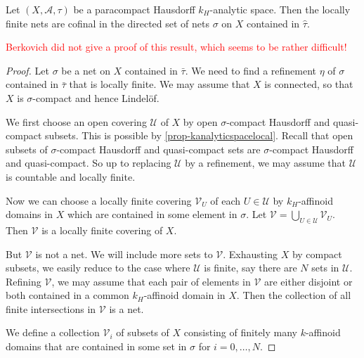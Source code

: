 \begin{proposition}
    Let $(X,\mathcal{A},\tau)$ be a paracompact Hausdorff $k_H$-analytic space. Then the locally finite nets are cofinal in the directed set of nets $\sigma$ on $X$ contained in $\hat{\tau}$. 
\end{proposition}
\textcolor{red}{Berkovich did not give a proof of this result, which seems to be rather difficult!}
\begin{proof}
    Let $\sigma$ be a net on $X$ contained in $\bar{\tau}$. We need to find a refinement $\eta$ of $\sigma$ contained in $\bar{\tau}$ that is locally finite.
    We may assume that $X$ is connected, so that $X$ is $\sigma$-compact and hence Lindel\"of.

    We first choose an open covering $\mathcal{U}$ of $X$ by open $\sigma$-compact Hausdorff and quasi-compact subsets. This is possible by \cref{prop-kanalyticspacelocal}.
    Recall that open subsets of $\sigma$-compact Hausdorff and quasi-compact sets are $\sigma$-compact Hausdorff and quasi-compact. So up to replacing $\mathcal{U}$ by a refinement, we may assume that $\mathcal{U}$ is countable and locally finite. 
    
    Now we can choose a locally finite covering $\mathcal{V}_U$ of each $U\in \mathcal{U}$ by $k_H$-affinoid domains in $X$ which are contained in some element in $\sigma$. Let $\mathcal{V}=\bigcup_{U\in \mathcal{U}}\mathcal{V}_U$. Then $\mathcal{V}$ is a locally finite covering of $X$. 
    
    But $\mathcal{V}$ is not a net. We will include more sets to $\mathcal{V}$. Exhausting $X$ by compact subsets, we easily reduce to the case where $\mathcal{U}$ is finite, say there are $N$ sets in $\mathcal{U}$. 
    Refining $\mathcal{V}$, we may assume that each pair of elements in $\mathcal{V}$ are either disjoint or both contained in a common $k_H$-affinoid domain in $X$. Then the collection of all finite intersections in $\mathcal{V}$ is a net.
    
    
    \iffalse
    
    We define a collection $\mathcal{V}_i$ of subsets of $X$ consisting of finitely many $k$-affinoid domains that are contained in some set in $\sigma$ for $i=0,\ldots,N$. 
    

\end{proof}
